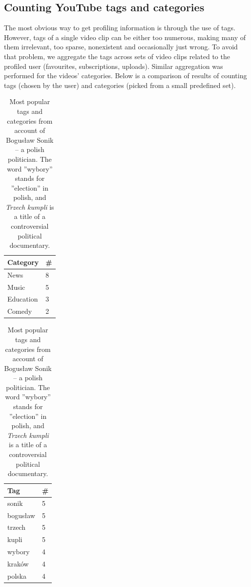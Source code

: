 \documentclass{article}
\begin{document}
\subsection{Counting YouTube tags and categories}
The most obvious way to get profiling information is through the use of
tags. However, tags of a single video clip can be either too numerous, making many
of them irrelevant, too sparse, nonexistent and occasionally just wrong. To avoid
that problem, we aggregate the tags across sets of video clips related to the
profiled user (favourites, subscriptions, uploads). Similar aggregation was
performed for the videos' categories. Below is a comparison of results of counting
tags (chosen by the user) and categories (picked from a small predefined set).







\begin{table}[ht]
\begin{minipage}[b]{0.5\linewidth}\centering

\begin{tabular}{| l | l |}
Category & \# \\ \hline
News & 8 \\
Music & 5 \\
Education & 3 \\
Comedy & 2 \\
\end{tabular}

\end{minipage}
\hspace{0.5cm}
\begin{minipage}[b]{0.5\linewidth}
\centering

\begin{tabular}{| l | l |}
Tag & \# \\ \hline
sonik & 5 \\
bogusław & 5 \\
trzech & 5 \\
kupli & 5 \\
wybory & 4 \\
kraków & 4 \\
polska & 4 \\
\end{tabular}

\end{minipage}

\caption{Most popular tags and categories from account of Bogusław Sonik -- a
polish politician. The word ''wybory'' stands for ''election'' in polish, and
\emph{Trzech kumpli} is a title of a controversial political documentary.}
\end{table}
\end{document}
